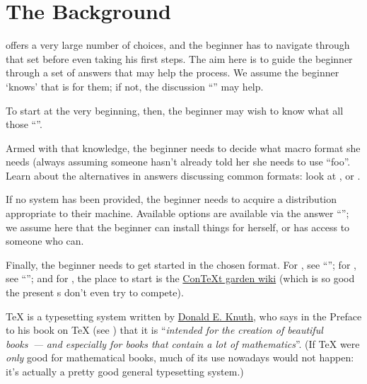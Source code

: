 
\section{The Background}


\alltex{} offers a very large number of choices, and the beginner has
to navigate through that set before even taking his first steps.  The
aim here is to guide the beginner through a set of answers that may
help the process.  We assume the beginner `knows' that \alltex{} is
for them; if not, the discussion ``''
may help.

To start at the very beginning, then, the beginner may wish to know
what all those %
``''.

Armed with that knowledge, the beginner needs to decide what macro
format she needs (always assuming someone hasn't already told her she
needs to use ``foo\tex{}''.  Learn about the alternatives in answers
discussing common formats: look at %
,
 or
.

If no system has been provided, the beginner needs to acquire a \tex{}
distribution appropriate to their machine.  Available options are
available via the answer %
``''; we assume
here that the beginner can install things for herself, or has access
to someone who can.

Finally, the beginner needs to get started in the chosen format.  For
\plaintex{}, see ``'';
for \latex{}, see %
``''; and for
\context{}, the place to start is the %
\href{http://wiki.contextgarden.net/Main_Page}{ConTeXt garden wiki}
(which is so good the present s don't even try to compete).



\TeX{} is a typesetting system written by
\href{http://sunburn.stanford.edu/~knuth/}{Donald E. Knuth}, who
says in the Preface to his book on \TeX{}
(see ) that it is
``\emph{intended for the creation of beautiful books~---}
\emph{and especially for books that contain a lot of mathematics}''.
(If \TeX{} were \emph{only} good for mathematical books, much of its
use nowadays would not happen: it's actually a pretty good general
typesetting system.)

